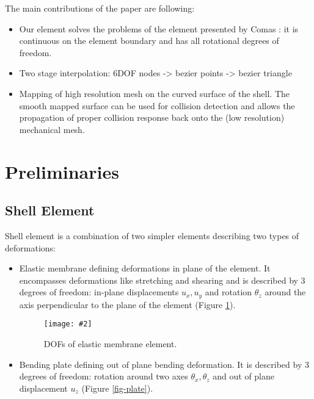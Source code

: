 \documentclass{egpubl}
\newcommand{\Figure}[3]{%
\begin{figure}[htb]
  \centering
  \texttt{[image: \#2]}
  \caption{\label{fig-#2}#3}
\end{figure}}
\begin{document}
The main contributions of the paper are following:
\begin{itemize}
    \item Our element solves the problems of the element presented by Comas
        \cite{Comas2010c}: it is continuous on the element boundary and has
        all rotational degrees of freedom.

    \item Two stage interpolation: 6DOF nodes -> bezier points -> bezier
        triangle


    \item Mapping of high resolution mesh on the curved surface of the
        shell. The smooth mapped surface can be used for collision
        detection and allows the propagation of proper collision response
        back onto the (low resolution) mechanical mesh.

\end{itemize}


\section{Preliminaries} %

\subsection{Shell Element}

Shell element is a combination of two simpler elements describing two types
of deformations:

\begin{itemize}

    \item Elastic membrane defining deformations in plane of the
    element. It encompasses deformations like stretching and shearing and
    is described by 3 degrees of freedom: in-plane displacements $u_x, u_y$
    and rotation $\theta_z$ around the axis perpendicular to the plane of
    the element (Figure \ref{fig-membrane}).

\Figure{0.8\linewidth}{membrane}
{DOFs of elastic membrane element.}


    \item Bending plate defining out of plane bending deformation. It is
    described by 3 degrees of freedom: rotation around two axes $\theta_x,
    \theta_z$ and out of plane displacement $u_z$ (Figure \ref{fig-plate}).

\end{itemize}
\end{document}
